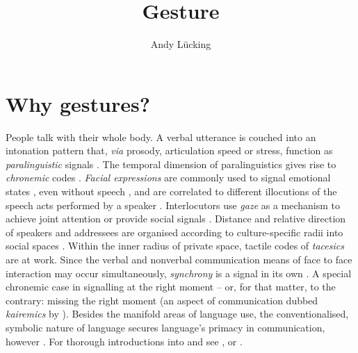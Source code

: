 \documentclass[output=paper]{langsci/langscibook}
\author{Andy Lücking\affiliation{Goethe-Universität Frankfurt}}
\title{Gesture}
\begin{document}
\label{chap-gesture}

\avmoptions{}

\section{Why gestures?} 
\label{sec:why-gestures}

People talk with their whole body. 
%
A verbal utterance is couched into an intonation pattern that, \textit{via} prosody, articulation speed or stress, function as \emph{paralinguistic}  signals \citep[e.g.][]{Birdwhistell:1970}. 
%
The temporal dimension of paralinguistics gives rise to \emph{chronemic} codes  \citep{Poyatos:1975,Bruneau:1980}. \emph{Facial expressions}  are commonly used to signal emotional states  \citep{Ekman:Friesen:1978}, even without speech \citep{Argyle:1975}, and are correlated to different illocutions of the speech acts performed by a speaker \citep{Domaneschi:Passarelli:Chiorri:2017}.
%
Interlocutors use \emph{gaze}  as a mechanism to achieve joint attention \citep{Argyle:Cook:1976} or provide social signals \citep{Kendon:1967}. 
%
Distance and relative direction of speakers and addressees are organised according to culture-specific radii into social spaces  \citep[\emph{proxemics},][]{Hall:1968}. 
%
Within the inner radius of private space, tactile codes of \emph{tacesics}  \citep{Kauffman:1971} are at work. 
%
Since the verbal and nonverbal communication means of face to face interaction  may occur simultaneously, \emph{synchrony}  is a signal in its own \citep{Wiltshire:2007}. 
%
A special chronemic case in signalling at the right moment -- or, for that matter, to the contrary: missing the right moment (an aspect of communication dubbed \emph{kairemics}  by \citet[]{Luecking:Pfeiffer:2012}).
%
Besides the manifold areas of language use, the conventionalised, symbolic nature of language secures language's primacy in communication, however \citep{de:Ruiter:2004}.
%
For thorough introductions into  and  see \citet{Noeth:1990}, \citet{Posner:Robering:Sebeok:1997:2004} or \citet{Mueller:Cienki:Fricke:Ladewig:McNeill:Tessendorf:2013:2014}.
\end{document}
